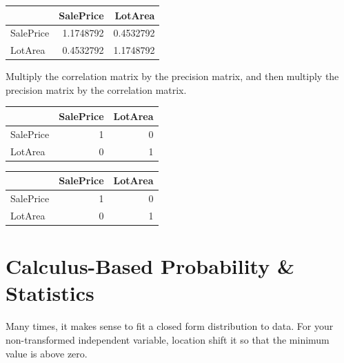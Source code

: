 \documentclass[]{article}
\newenvironment{Shaded}{\begin{snugshade}}{\end{snugshade}}
\newcommand{\KeywordTok}[1]{\textcolor[rgb]{0.13,0.29,0.53}{\textbf{{#1}}}}
\newcommand{\StringTok}[1]{\textcolor[rgb]{0.31,0.60,0.02}{{#1}}}
\newcommand{\NormalTok}[1]{{#1}}
\begin{document}
\begin{longtable}[]{@{}lrr@{}}
\toprule
& SalePrice & LotArea\tabularnewline
\midrule
\endhead
SalePrice & 1.1748792 & 0.4532792\tabularnewline
LotArea & 0.4532792 & 1.1748792\tabularnewline
\bottomrule
\end{longtable}

Multiply the correlation matrix by the precision matrix, and then
multiply the precision matrix by the correlation matrix.

\begin{Shaded}
\end{Shaded}

\begin{longtable}[]{@{}lrr@{}}
\toprule
& SalePrice & LotArea\tabularnewline
\midrule
\endhead
SalePrice & 1 & 0\tabularnewline
LotArea & 0 & 1\tabularnewline
\bottomrule
\end{longtable}

\begin{Shaded}
\end{Shaded}

\begin{longtable}[]{@{}lrr@{}}
\toprule
& SalePrice & LotArea\tabularnewline
\midrule
\endhead
SalePrice & 1 & 0\tabularnewline
LotArea & 0 & 1\tabularnewline
\bottomrule
\end{longtable}

\section{Calculus-Based Probability \&
Statistics}\label{calculus-based-probability-statistics}

Many times, it makes sense to fit a closed form distribution to data.
For your non-transformed independent variable, location shift it so that
the minimum value is above zero.

\begin{Shaded}
\end{Shaded}
\end{document}
